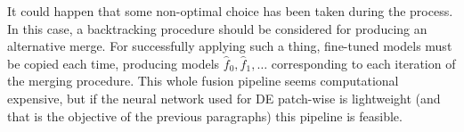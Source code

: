 It could happen that some non-optimal choice has been taken during the process.
In this case, a backtracking procedure should be considered for producing an alternative merge.
For successfully applying such a thing, fine-tuned models must be copied each time, producing models $\hat{f}_{0}, \hat{f}_{1}, \dotsc$ corresponding to each iteration of the merging procedure.
This whole fusion pipeline seems computational expensive, but if the neural network used for DE patch-wise is lightweight (and that is the objective of the previous paragraphs) this pipeline is feasible.

